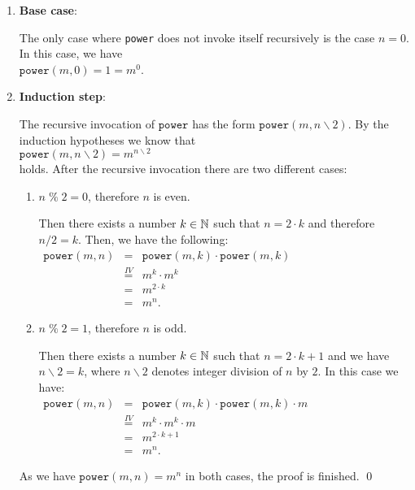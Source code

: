 \begin{enumerate}
\item \textbf{Base case}:

      The only case where \texttt{power} does not invoke itself recursively is the case $n = 0$.  
      In this case, we have
      \\[0.2cm]
      \hspace*{1.3cm} 
      $\mathtt{power}(m,0) = 1 =  m^0$.
\item \textbf{Induction step}:

      The recursive invocation of $\mathtt{power}$ has the form
      $\mathtt{power}(m,n \backslash 2)$.  By the induction hypotheses we know that 
      \\[0.2cm]
      \hspace*{1.3cm}
      $\displaystyle \mathtt{power}(m,n \backslash 2) = m^{n \backslash 2}$ 
      \\[0.2cm]
      holds.  After the recursive invocation there are two different cases:
      \begin{enumerate}
      \item $n \;\texttt{\%}\; 2 = 0$, therefore $n$ is even.

            Then there exists a number $k \in {\mathbb N}$ such that $n = 2 \cdot k$ and therefore
            $n / 2 = k$.
            Then, we have the following:
            \\[0.2cm]
            \hspace*{1.3cm}
           $ 
            \begin{array}{lcl}
            \mathtt{power}(m,n) & = & \mathtt{power}(m,k) \cdot \mathtt{power}(m,k) \\[0.2cm]
                                & \stackrel{IV}{=} & m^k \cdot m^k  \\[0.2cm]
                                & = & m^{2\cdot k} \\[0.2cm]
                                & = & m^{n}.
            \end{array}
            $            
      \item $n \;\texttt{\%}\; 2 = 1$, therefore $n$ is odd.

            Then there exists a number $k \in {\mathbb N}$ such that $n = 2 \cdot k + 1$ and we have
            $n \backslash 2 = k$, where $n \backslash 2$ denotes integer division of $n$ by $2$.
            In this case we have:
            \\[0.2cm]
            \hspace*{1.3cm}
            $ 
            \begin{array}{lcl}
            \mathtt{power}(m,n) & = & \mathtt{power}(m,k) \cdot \mathtt{power}(m,k) \cdot m  \\[0.2cm]
                                & \stackrel{IV}{=} & m^k \cdot m^k \cdot m  \\[0.2cm]
                                & = & m^{2\cdot k+1} \\[0.2cm]
                                & = & m^{n}.
            \end{array}
            $
      \end{enumerate}
      As we have $\mathtt{power}(m,n) = m^n$ in both cases, the proof is finished.
      \qed
\end{enumerate}
